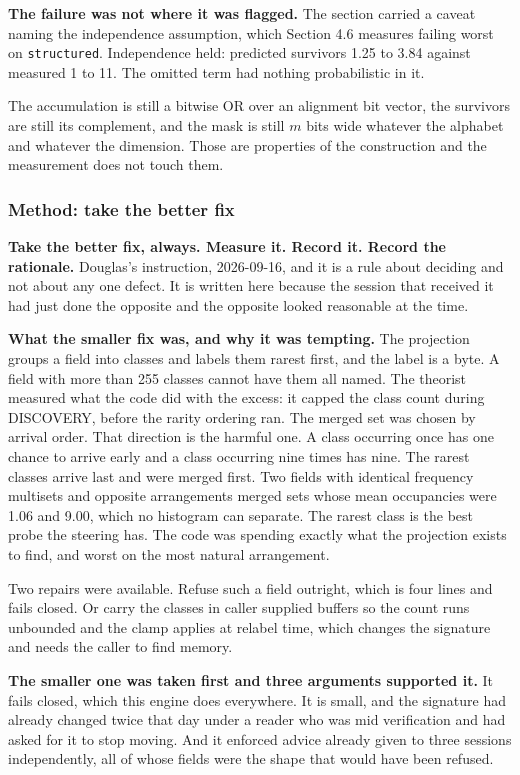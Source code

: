\textbf{The failure was not where it was flagged.} The section carried a caveat naming the independence assumption, which Section 4.6 measures failing worst on \texttt{structured}. Independence held: predicted survivors 1.25 to 3.84 against measured 1 to 11. The omitted term had nothing probabilistic in it.

The accumulation is still a bitwise OR over an alignment bit vector, the survivors are still its complement, and the mask is still \(m\) bits wide whatever the alphabet and whatever the dimension. Those are properties of the construction and the measurement does not touch them.

\subsubsection{Method: take the better fix}

\textbf{Take the better fix, always. Measure it. Record it. Record the rationale.} Douglas's instruction, 2026-09-16, and it is a rule about deciding and not about any one defect. It is written here because the session that received it had just done the opposite and the opposite looked reasonable at the time.

\textbf{What the smaller fix was, and why it was tempting.} The projection groups a field into classes and labels them rarest first, and the label is a byte. A field with more than 255 classes cannot have them all named. The theorist measured what the code did with the excess: it capped the class count during DISCOVERY, before the rarity ordering ran. The merged set was chosen by arrival order. That direction is the harmful one. A class occurring once has one chance to arrive early and a class occurring nine times has nine. The rarest classes arrive last and were merged first. Two fields with identical frequency multisets and opposite arrangements merged sets whose mean occupancies were 1.06 and 9.00, which no histogram can separate. The rarest class is the best probe the steering has. The code was spending exactly what the projection exists to find, and worst on the most natural arrangement.

Two repairs were available. Refuse such a field outright, which is four lines and fails closed. Or carry the classes in caller supplied buffers so the count runs unbounded and the clamp applies at relabel time, which changes the signature and needs the caller to find memory.

\textbf{The smaller one was taken first and three arguments supported it.} It fails closed, which this engine does everywhere. It is small, and the signature had already changed twice that day under a reader who was mid verification and had asked for it to stop moving. And it enforced advice already given to three sessions independently, all of whose fields were the shape that would have been refused.

